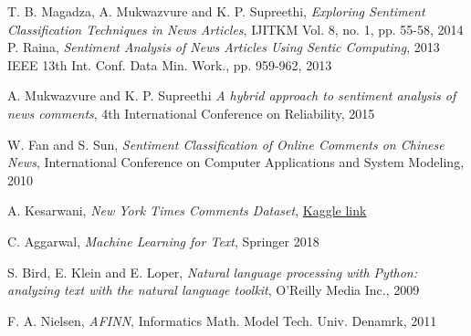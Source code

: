 \begin{thebibliography}{15}

\vspace{1cm}

T. B. Magadza, A. Mukwazvure and K. P. Supreethi,
  \textit{Exploring Sentiment Classification Techniques in News Articles}, IJITKM Vol. 8, no. 1, pp. 55-58, 2014
P. Raina, \textit{Sentiment Analysis of News Articles Using Sentic Computing}, 2013 IEEE 13th Int. Conf. Data Min. Work., pp. 959-962, 2013

A. Mukwazvure and K. P. Supreethi \textit{A hybrid approach to sentiment analysis of news comments}, 4th International Conference on Reliability, 2015

W. Fan and S. Sun, \textit{Sentiment Classification of Online Comments on Chinese News}, International Conference on Computer Applications and System Modeling, 2010

A. Kesarwani, \textit{New York Times Comments Dataset}, \href{https://www.kaggle.com/aashita/nyt-comments}{Kaggle link}

C. Aggarwal, \textit{Machine Learning for Text}, Springer 2018

S. Bird, E. Klein and E. Loper, \textit{Natural language processing with Python: analyzing text with the natural language toolkit}, O'Reilly Media Inc., 2009

F. A. Nielsen, \textit{AFINN}, Informatics Math. Model Tech. Univ. Denamrk, 2011


\end{thebibliography}